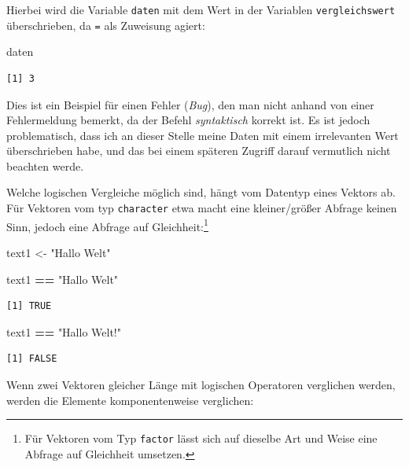 \documentclass[12pt,]{tufte-book}
\newenvironment{Shaded}{\begin{snugshade}}{\end{snugshade}}
\newcommand{\StringTok}[1]{\textcolor[rgb]{0.31,0.60,0.02}{#1}}
\newcommand{\OperatorTok}[1]{\textcolor[rgb]{0.81,0.36,0.00}{\textbf{#1}}}
\newcommand{\NormalTok}[1]{#1}
\theoremstyle{definition}
\theoremstyle{definition}
\theoremstyle{definition}
\theoremstyle{remark}
\begin{document}
Hierbei wird die Variable \texttt{daten} mit dem Wert in der Variablen
\texttt{vergleichswert} überschrieben, da \texttt{=} als Zuweisung
agiert:

\begin{Shaded}
\begin{Highlighting}[]
\NormalTok{daten}
\end{Highlighting}
\end{Shaded}

\begin{verbatim}
[1] 3
\end{verbatim}

Dies ist ein Beispiel für einen Fehler (\emph{Bug}), den man nicht
anhand von einer Fehlermeldung bemerkt, da der Befehl \emph{syntaktisch}
korrekt ist. Es ist jedoch problematisch, dass ich an dieser Stelle
meine Daten mit einem irrelevanten Wert überschrieben habe, und das bei
einem späteren Zugriff darauf vermutlich nicht beachten werde.

Welche logischen Vergleiche möglich sind, hängt vom Datentyp eines
Vektors ab. Für Vektoren vom typ \texttt{character} etwa macht eine
kleiner/größer Abfrage keinen Sinn, jedoch eine Abfrage auf
Gleichheit:\footnote{Für Vektoren vom Typ \texttt{factor} lässt sich auf
  dieselbe Art und Weise eine Abfrage auf Gleichheit umsetzen.}

\begin{Shaded}
\begin{Highlighting}[]
\NormalTok{text1 <-}\StringTok{ "Hallo Welt"}

\NormalTok{text1 }\OperatorTok{==}\StringTok{ "Hallo Welt"}
\end{Highlighting}
\end{Shaded}

\begin{verbatim}
[1] TRUE
\end{verbatim}

\begin{Shaded}
\begin{Highlighting}[]
\NormalTok{text1 }\OperatorTok{==}\StringTok{ "Hallo Welt!"}
\end{Highlighting}
\end{Shaded}

\begin{verbatim}
[1] FALSE
\end{verbatim}

Wenn zwei Vektoren gleicher Länge mit logischen Operatoren verglichen
werden, werden die Elemente komponentenweise verglichen:
\end{document}
